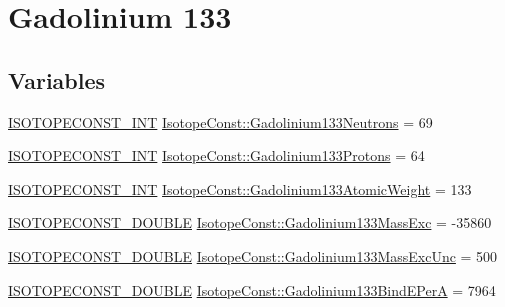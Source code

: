 \hypertarget{group___isotope_const-_gadolinium-_gd133}{}\section{Gadolinium 133}
\label{group___isotope_const-_gadolinium-_gd133}
\subsection*{Variables}
\begin{DoxyCompactItemize}
\item 
\mbox{\hyperlink{group___isotope_const-_macros_ga5f18360b3e99483a35c32d789e62621c}{I\+S\+O\+T\+O\+P\+E\+C\+O\+N\+S\+T\+\_\+\+I\+NT}} \mbox{\hyperlink{group___isotope_const-_gadolinium-_gd133_gab55239a94ccaeb24b76cbc52e851d90b}{Isotope\+Const\+::\+Gadolinium133\+Neutrons}} = 69
\item 
\mbox{\hyperlink{group___isotope_const-_macros_ga5f18360b3e99483a35c32d789e62621c}{I\+S\+O\+T\+O\+P\+E\+C\+O\+N\+S\+T\+\_\+\+I\+NT}} \mbox{\hyperlink{group___isotope_const-_gadolinium-_gd133_ga938de94e859276452eab45a72c0fab1b}{Isotope\+Const\+::\+Gadolinium133\+Protons}} = 64
\item 
\mbox{\hyperlink{group___isotope_const-_macros_ga5f18360b3e99483a35c32d789e62621c}{I\+S\+O\+T\+O\+P\+E\+C\+O\+N\+S\+T\+\_\+\+I\+NT}} \mbox{\hyperlink{group___isotope_const-_gadolinium-_gd133_gadede313afccb9beb0a9c2a9b6261de55}{Isotope\+Const\+::\+Gadolinium133\+Atomic\+Weight}} = 133
\item 
\mbox{\hyperlink{group___isotope_const-_macros_ga8f45a7272ce02c0b4c65c44636ed719a}{I\+S\+O\+T\+O\+P\+E\+C\+O\+N\+S\+T\+\_\+\+D\+O\+U\+B\+LE}} \mbox{\hyperlink{group___isotope_const-_gadolinium-_gd133_ga916bf4de0fdb63f0d9fe251538b1e0dd}{Isotope\+Const\+::\+Gadolinium133\+Mass\+Exc}} = -\/35860
\item 
\mbox{\hyperlink{group___isotope_const-_macros_ga8f45a7272ce02c0b4c65c44636ed719a}{I\+S\+O\+T\+O\+P\+E\+C\+O\+N\+S\+T\+\_\+\+D\+O\+U\+B\+LE}} \mbox{\hyperlink{group___isotope_const-_gadolinium-_gd133_ga46aa9305b4717d931f944f894cfa3d88}{Isotope\+Const\+::\+Gadolinium133\+Mass\+Exc\+Unc}} = 500
\item 
\mbox{\hyperlink{group___isotope_const-_macros_ga8f45a7272ce02c0b4c65c44636ed719a}{I\+S\+O\+T\+O\+P\+E\+C\+O\+N\+S\+T\+\_\+\+D\+O\+U\+B\+LE}} \mbox{\hyperlink{group___isotope_const-_gadolinium-_gd133_gae19d0386ceb2228e74f2b4251308f4d5}{Isotope\+Const\+::\+Gadolinium133\+Bind\+E\+PerA}} = 7964
\item 

\end{DoxyCompactItemize}
